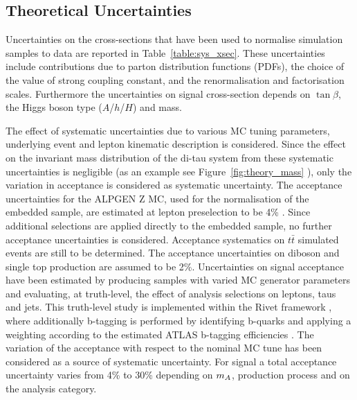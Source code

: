 \subsection{Theoretical Uncertainties}
\label{sec:sys_theory}

Uncertainties on the cross-sections that have been used to normalise
simulation samples to data are reported in
Table~\ref{table:sys_xsec}. These
uncertainties include contributions due to parton distribution
functions (PDFs), the choice of the value of strong coupling constant,
and the renormalisation and factorisation scales.  Furthermore the
uncertainties on signal cross-section depends on $\tan\beta$, the
Higgs boson type ($A$/$h$/$H$) and mass.

The effect of systematic uncertainties due to various MC tuning
parameters, underlying event and
lepton kinematic description is considered.
Since the effect on the invariant mass distribution of the di-tau system from these systematic
uncertainties is negligible (as an example see
Figure~\ref{fig:theory_mass} ), only the variation in
acceptance is considered as systematic uncertainty.
The acceptance uncertainties for the ALPGEN Z MC, used for the normalisation of the embedded sample, 
are estimated at lepton preselection to be 4\% \cite{2010SMLLSupportNote}.
Since additional selections are applied directly to the embedded sample, 
no further acceptance uncertainties is considered. Acceptance systematics on
$t\bar{t}$ simulated events are still to be determined. %
The acceptance uncertainties on diboson and single top production are assumed to be 2\%.
Uncertainties on signal acceptance have been estimated
by producing samples with varied MC generator parameters and evaluating, at
truth-level, the effect of analysis selections on leptons, taus and
jets. This truth-level study is implemented within the Rivet framework
\cite{RIVET}, where additionally b-tagging is performed by identifying b-quarks and applying
a weighting according to the estimated ATLAS b-tagging
efficiencies \cite{BtaggingScaleFactors}. The variation of the acceptance
with respect to the nominal MC tune has  been considered as
a source of systematic uncertainty. For signal a total acceptance 
uncertainty varies from 4\% to 30\% depending on $m_{A}$, production process 
and on the analysis category.

